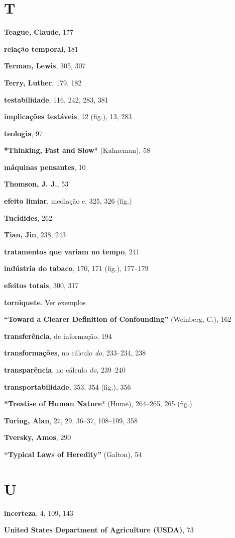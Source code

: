 \documentclass[11pt,a5paper,twoside]{book}
\begin{document}
\section{T}
\textbf{Teague, Claude}, 177

\textbf{relação temporal}, 181

\textbf{Terman, Lewis}, 305, 307

\textbf{Terry, Luther}, 179, 182

\textbf{testabilidade}, 116, 242, 283, 381

\textbf{implicações testáveis}, 12 (fig.), 13, 283

\textbf{teologia}, 97

\textbf{*Thinking, Fast and Slow}* (Kahneman), 58

\textbf{máquinas pensantes}, 10

\textbf{Thomson, J. J.}, 53

\textbf{efeito limiar}, mediação e, 325, 326 (fig.)

\textbf{Tucídides}, 262

\textbf{Tian, Jin}, 238, 243

\textbf{tratamentos que variam no tempo}, 241

\textbf{indústria do tabaco}, 170, 171 (fig.), 177–179

\textbf{efeitos totais}, 300, 317

\textbf{torniquete}. Ver exemplos

\textbf{“Toward a Clearer Definition of Confounding”} (Weinberg, C.), 162

\textbf{transferência}, de informação, 194

\textbf{transformações}, no cálculo \textit{do}, 233–234, 238

\textbf{transparência}, no cálculo \textit{do}, 239–240

\textbf{transportabilidade}, 353, 354 (fig.), 356

\textbf{*Treatise of Human Nature}* (Hume), 264–265, 265 (fig.)

\textbf{Turing, Alan}, 27, 29, 36–37, 108–109, 358

\textbf{Tversky, Amos}, 290

\textbf{“Typical Laws of Heredity”} (Galton), 54

\section{U}
\textbf{incerteza}, 4, 109, 143

\textbf{United States Department of Agriculture (USDA)}, 73
\end{document}

